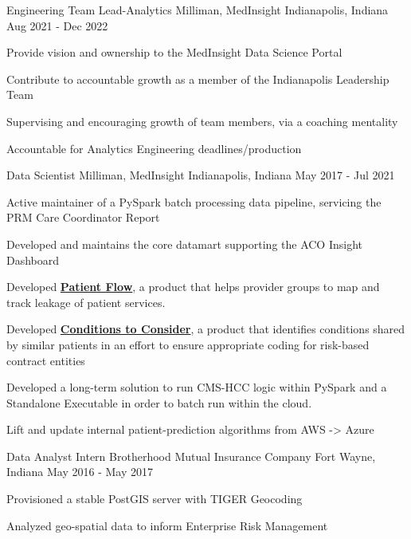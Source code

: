 \begin{cventries}
  \cventry
    {Engineering Team Lead-Analytics} %
    {Milliman, MedInsight} %
    {Indianapolis, Indiana} %
    {Aug 2021 - Dec 2022} %
    {
      \begin{cvitems} %
        \item {Provide vision and ownership to the MedInsight Data Science Portal}
	\item {Contribute to accountable growth as a member of the Indianapolis Leadership Team}
        \item {Supervising and encouraging growth of team members, via a coaching mentality}
	\item {Accountable for Analytics Engineering deadlines/production}
      \end{cvitems}
    }

  \cventry
    {Data Scientist} %
    {Milliman, MedInsight} %
    {Indianapolis, Indiana} %
    {May 2017 - Jul 2021} %
    {
      \begin{cvitems} %
        \item {Active maintainer of a PySpark batch processing data pipeline, servicing the PRM Care Coordinator Report}
        \item {Developed and maintains the core datamart supporting the ACO Insight Dashboard}
        \item {Developed \href{http://www.medinsight.milliman.com/uploadedFiles/MedInsight_Site/About/MedInsight-Patient-Flow.pdf}{\textbf{Patient Flow}}, a product that helps provider groups to map and track leakage of patient services.}
	\item {Developed \href{http://assets.milliman.com/ektron/medinsight-machine-learning-conditions-consider.pdf}{\textbf{Conditions to Consider}}, a product that identifies conditions shared by similar patients in an effort to ensure appropriate coding for risk-based contract entities}
	\item {Developed a long-term solution to run CMS-HCC logic within PySpark and a Standalone Executable in order to batch run within the cloud.}
	\item {Lift and update internal patient-prediction algorithms from AWS -> Azure}
      \end{cvitems}
    }

  \cventry
    {Data Analyst Intern} %
    {Brotherhood Mutual Insurance Company} %
    {Fort Wayne, Indiana} %
    {May 2016 - May 2017} %
    {
      \begin{cvitems} %
        \item {Provisioned a stable PostGIS server with TIGER Geocoding}
        \item {Analyzed geo-spatial data to inform Enterprise Risk Management}
      \end{cvitems}
    }


\end{cventries}
